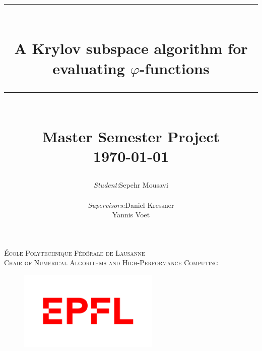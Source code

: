 \documentclass[12pt, a4paper]{article}
\title{
	\rule{\linewidth}{0.5mm}\\
	\Large \textbf{{A Krylov subspace algorithm for evaluating $\varphi$-functions}}
	\rule{\linewidth}{0.5mm}\\
	\normalsize {\textbf{Master Semester Project}}\\
	\normalsize \today\\[1.5cm]
}
\author{
	\begin{tabular}{lll}
		\textit{Student:} & Sepehr Mousavi\\
		& \\
		\textit{Supervisors:} & Daniel Kressner\\
		\textit{} & Yannis Voet\\
	\end{tabular}
}
\begin{document}
	\begin{titlepage}
		\center

		\makeatletter
		\def\printauthor{{\centering \large \@author}}
		\makeatother

		\makeatletter
		\def\printtitle{{\centering \@title\par}}
		\makeatother

		\textsc{
			\large École Polytechnique Fédérale de Lausanne\\
			\large Chair of Numerical Algorithms and High-Performance Computing
		}\\[1cm]
		\vspace{3cm}
		\printtitle
		\vspace{2cm}
		\printauthor
		\vfill
		\begin{figure}[h]
			\centering
			\includegraphics[width = 0.6\textwidth]{img/EPFLlogo.png}
		\end{figure}

	\end{titlepage}

	\tableofcontents
	\listoftodos
	\thispagestyle{plain}
	\newpage

	\begin{abstract}
		
	\end{abstract}

	
	\newpage
	
	\newpage
	\appendix
	
\end{document}
